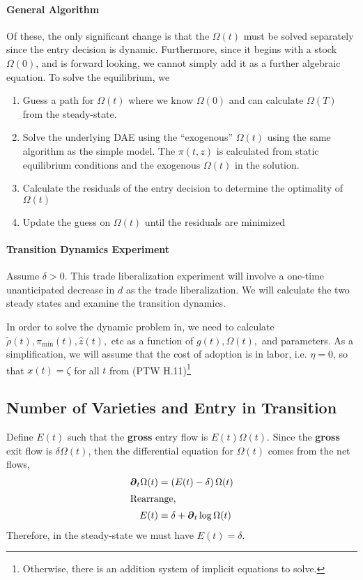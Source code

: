 \documentclass[11pt]{article}
\newcommand{\D}[1][]{\ensuremath{\boldsymbol{\partial}_{#1}}}
\begin{document}
\paragraph{General Algorithm}
Of these, the only significant change is that the $\Omega(t)$ must be solved separately since the entry decision is dynamic.  Furthermore, since it begins with a stock $\Omega(0)$, and is forward looking, we cannot simply add it as a further algebraic equation.  To solve the equilibrium, we
\begin{enumerate}
	\item Guess a path for $\Omega(t)$ where we know $\Omega(0)$ and can calculate $\Omega(T)$ from the steady-state.
	\item Solve the underlying DAE using the ``exogenous'' $\Omega(t)$ using the same algorithm as the simple model.  The $\pi(t,z)$ is calculated from static equilibrium conditions and the exogenous $\Omega(t)$ in the solution.
	\item Calculate the residuals of the entry decision to determine the optimality of $\Omega(t)$
	\item Update the guess on $\Omega(t)$ until the residuals are minimized
\end{enumerate}

\paragraph{Transition Dynamics Experiment}

Assume $\delta > 0$.  This trade liberalization experiment will involve a one-time unanticipated decrease in $d$ as the trade liberalization.  We will calculate the two steady states and examine the transition dynamics.

In order to solve the dynamic problem in, we need to calculate $\tilde{\rho}(t), \pi_{\min}(t),\hat{z}(t),$ etc  as a function of $g(t), \Omega(t),$ and parameters.  As a simplification, we will assume that the cost of adoption is in labor, i.e. $\eta = 0$, so that $x(t) = \zeta$ for all $t$ from (PTW H.11)\footnote{Otherwise, there is an addition system of implicit equations to solve.}  %

\subsection{Number of Varieties and Entry in Transition}

Define $E(t)$ such that the \textbf{gross} entry flow is $E(t)\Omega(t)$.  Since the \textbf{gross} exit flow is $\delta \Omega(t)$, then the differential equation for $\Omega(t)$ comes from the net flows,
\begin{align} \label{eq:E-defined-by-Omega}
	\D[t] \Omega(t) &= \left(E(t) - \delta \right)\Omega(t)\\
\intertext{Rearrange,}
E(t) &\equiv \delta + \D[t]\log \Omega(t)
\end{align}
Therefore, in the steady-state we must have $E(t) = \delta$.
\end{document}
